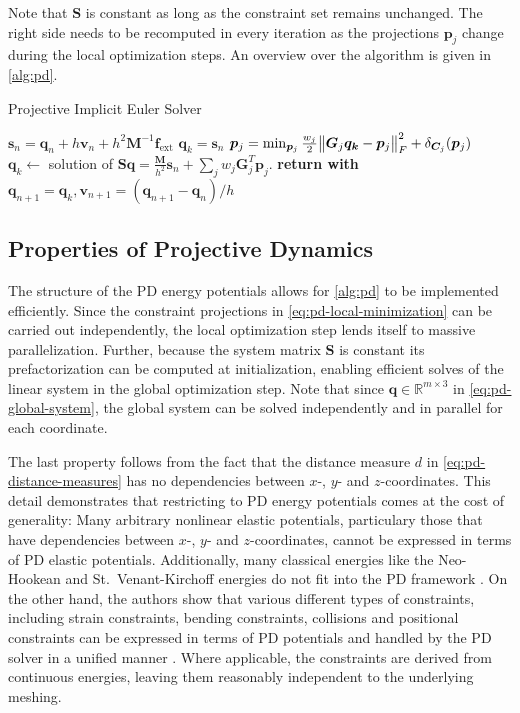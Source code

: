 Note that $\bm{S}$ is constant as long as the constraint set remains unchanged. The right side needs to be recomputed in every 
iteration as the projections $\bm{p}_j$ change during the local optimization steps.  An overview over the algorithm is given in \cref{alg:pd}.

\begin{algorithm}
\caption{Projective Implicit Euler Solver}\label{alg:pd}
\begin{algorithmic}
\State $\bm{s}_n = \bm{q}_n + h\bm{v}_n + h^2\bm{M}^{-1}\bm{f}_{\text{ext}}$
\State $\bm{q}_k = \bm{s}_n$
\State $\bm{p}_j = \min_{\bm{p}_j} \frac{w_j}{2}\norm{\bm{G}_j\bm{q_k} - \bm{p}_j}^2_F + \delta_{\bm{C}_j}(\bm{p}_j)$
\EndFor
\State $\bm{q}_{k} \gets$ solution of $\bm{S}\bm{q} = \frac{\bm{M}}{h^2}\bm{s}_n + \sum_j w_j \bm{G}_j^T \bm{p}_j$.
\EndFor
\State \textbf{return with } $\bm{q}_{n+1} = \bm{q}_k, \bm{v}_{n+1} = (\bm{q}_{n+1} - \bm{q}_n) / h$
\EndProcedure
\end{algorithmic}
\end{algorithm}

\subsection{Properties of Projective Dynamics}\label{ss:pd-properties}
The structure of the PD energy potentials allows for \cref{alg:pd} to be implemented efficiently. Since the constraint projections
in \cref{eq:pd-local-minimization} can be carried out independently, the local optimization step lends itself to massive parallelization. 
Further, because the system matrix $\bm{S}$ is constant its prefactorization can be computed at initialization, enabling
efficient solves of the linear system in the global optimization step. Note that since $\bm{q} \in \mathbb{R}^{m \times 3}$ in \cref{eq:pd-global-system}, 
the global system can be solved independently and in parallel for each coordinate.

The last property follows from the fact that the distance measure $d$ in \cref{eq:pd-distance-measures} has no dependencies between 
$x$-, $y$- and $z$-coordinates. This detail demonstrates that restricting to PD energy potentials comes at the cost of generality: 
Many arbitrary nonlinear elastic potentials, particulary those that have dependencies between $x$-, $y$- and $z$-coordinates, cannot be expressed 
in terms of PD elastic potentials. Additionally, many classical energies like the Neo-Hookean and St.\ Venant-Kirchoff energies do not fit 
into the PD framework \cite{liu2017}. On the other hand, the authors show that various different types of constraints, including strain constraints, 
bending constraints, collisions and positional constraints can be expressed in terms of PD potentials and handled by the PD solver in a 
unified manner \cite{bouaziz2014}. Where applicable, the constraints are derived from continuous energies, leaving them reasonably independent 
to the underlying meshing.


